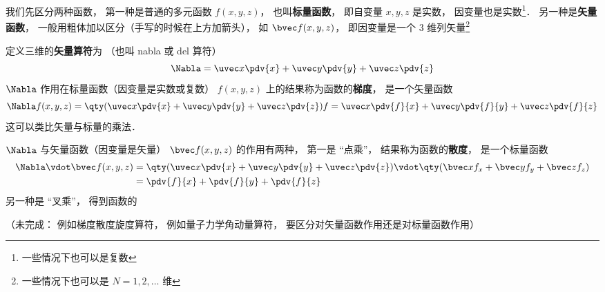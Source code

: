 

我们先区分两种函数， 第一种是普通的多元函数 $f(x, y, z)$， 也叫\textbf{标量函数}， 即自变量 $x, y, z$ 是实数， 因变量也是实数\footnote{一些情况下也可以是复数}． 另一种是\textbf{矢量函数}， 一般用粗体加以区分（手写的时候在上方加箭头）， 如 $\bvec f(x, y, z)$， 即因变量是一个 3 维列矢量\footnote{一些情况下也可以是 $N = 1, 2, \dots$ 维}

定义三维的\textbf{矢量算符}为 （也叫 nabla 或 del 算符）
\begin{equation}
\Nabla = \uvec x \pdv{x} + \uvec y \pdv{y} + \uvec z \pdv{z}
\end{equation}
$\Nabla$ 作用在标量函数（因变量是实数或复数） $f(x, y, z)$ 上的结果称为函数的\textbf{梯度}， 是一个矢量函数
\begin{equation}
\Nabla f(x, y, z) = \qty(\uvec x \pdv{x} + \uvec y \pdv{y} + \uvec z \pdv{z}) f = \uvec x \pdv{f}{x} + \uvec y \pdv{f}{y} + \uvec z \pdv{f}{z}
\end{equation}
这可以类比矢量与标量的乘法．


$\Nabla$ 与矢量函数（因变量是矢量） $\bvec f(x, y, z)$ 的作用有两种， 第一是 “点乘”， 结果称为函数的\textbf{散度}， 是一个标量函数
\begin{equation}
\begin{aligned}
\Nabla \vdot \bvec f(x, y, z) &= \qty(\uvec x \pdv{x} + \uvec y \pdv{y} + \uvec z \pdv{z}) \vdot \qty(\bvec x f_x + \bvec y f_y + \bvec z f_z)\\
&= \pdv{f}{x} + \pdv{f}{y} + \pdv{f}{z}
\end{aligned}
\end{equation}
另一种是 “叉乘”， 得到函数的


（未完成： 例如梯度散度旋度算符， 例如量子力学角动量算符， 要区分对矢量函数作用还是对标量函数作用）
